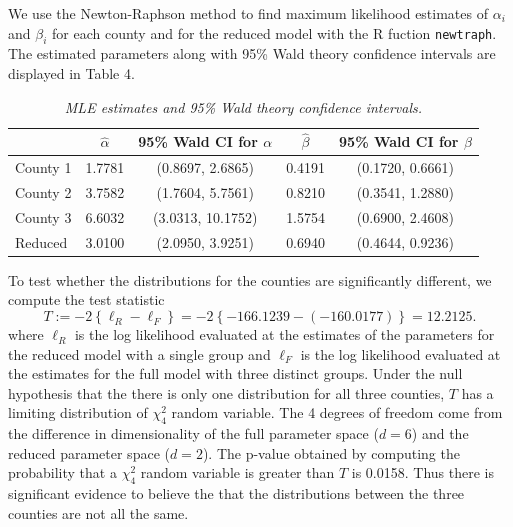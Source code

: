 \documentclass[12pt]{article}
\begin{document}
\begin{enumerate}
    We use the Newton-Raphson method to find maximum likelihood estimates of $\alpha_i$ and $\beta_i$ for each county and for the reduced model with the R fuction
    \texttt{newtraph}. The estimated parameters along with 95\% Wald theory confidence intervals are displayed in Table 4.

    \begin{table}[h]
      \caption{\emph{MLE estimates and 95\% Wald theory confidence intervals.}}
      \centering
      \begin{tabular}{|l|c|c|c|c|}
        \hline
        & $\hat{\alpha}$ & 95\% Wald CI for $\alpha$ & $\hat{\beta}$ & 95\% Wald CI for $\beta$ \\
        \hline 
        County 1 & 1.7781 & (0.8697, 2.6865) & 0.4191 & (0.1720, 0.6661) \\
        \hline
        County 2 & 3.7582 & (1.7604, 5.7561) & 0.8210 & (0.3541, 1.2880) \\
        \hline
        County 3 & 6.6032 & (3.0313, 10.1752) & 1.5754 & (0.6900, 2.4608) \\
        \hline
        Reduced & 3.0100 & (2.0950, 3.9251) & 0.6940 & (0.4644, 0.9236) \\
        \hline
      \end{tabular}
    \end{table}

    To test whether the distributions for the counties are significantly different, we compute the test statistic
    \[
      T := -2\left\{ \ell_{R} - \ell_{F} \right\} = -2\left\{ -166.1239 - (-160.0177) \right\} = 12.2125.
    \]
    where $\ell_{R}$ is the log likelihood evaluated at the estimates of the parameters for the reduced model with a single group and $\ell_{F}$ is
    the log likelihood evaluated at the estimates for the full model with three distinct groups. Under the null hypothesis that the there is only one
    distribution for all three counties, $T$ has a limiting distribution of $\chi_{4}^{2}$ random variable. The 4 degrees of freedom come from the
    difference in dimensionality of the full parameter space ($d = 6$) and the reduced parameter space ($d = 2$). The p-value obtained by computing
    the probability that a $\chi_{4}^{2}$ random variable is greater than $T$ is 0.0158. Thus there is significant evidence to believe the that the
    distributions between the three counties are not all the same.



\end{enumerate}
\end{document}
